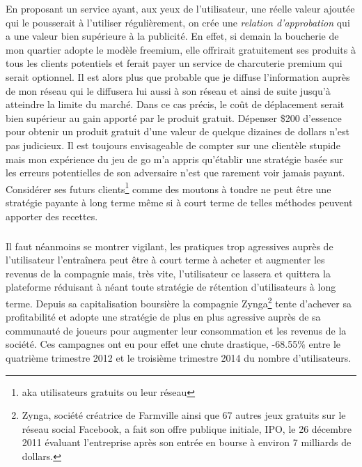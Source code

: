 \documentclass[11pt, a4paper ]{article}
\begin{document}
\begin{spacing}{1.5}
En proposant un service ayant, aux yeux de l'utilisateur, une réelle valeur ajoutée qui le pousserait à l'utiliser régulièrement, on crée une \emph{relation d'approbation} qui a une valeur bien supérieure à la publicité.
En effet, si demain la boucherie de mon quartier adopte le modèle freemium, elle offrirait gratuitement ses produits à tous les clients potentiels et ferait payer un service de charcuterie premium qui serait optionnel.
Il est alors plus que probable que je diffuse l'information auprès de mon réseau qui le diffusera lui aussi à son réseau et ainsi de suite jusqu'à atteindre la limite du marché. Dans ce cas précis, le coût de déplacement serait bien supérieur au gain apporté par le produit gratuit.
Dépenser \$200 d'essence pour obtenir un produit gratuit d'une valeur de quelque dizaines de dollars n'est pas judicieux. Il est toujours envisageable de compter sur une clientèle stupide mais mon expérience du jeu de go m'a appris qu'établir une stratégie basée sur les erreurs potentielles de son adversaire n'est que rarement voir jamais payant.
Considérer ses futurs clients\footnote{aka utilisateurs gratuits ou leur réseau} comme des moutons à tondre ne peut être une stratégie payante à long terme même si à court terme de telles méthodes peuvent apporter des recettes.
\subparagraph{}
Il faut néanmoins se montrer vigilant, les pratiques trop agressives auprès de l'utilisateur l’entraînera peut être à court terme à acheter et augmenter les revenus de la compagnie mais, très vite, l'utilisateur ce lassera et quittera la plateforme réduisant à néant toute stratégie de rétention d'utilisateurs à long terme. Depuis sa capitalisation boursière la compagnie Zynga\footnote{Zynga, société créatrice de Farmville ainsi que 67 autres jeux gratuits sur le réseau social Facebook, a fait son offre publique initiale, IPO, le 26 décembre 2011 évaluant l'entreprise après son entrée en bourse à environ 7 milliards de dollars.\cite{ipoZynga}} tente d'achever sa profitabilité et adopte une stratégie de plus en plus agressive auprès de sa communauté de joueurs pour augmenter leur consommation et les revenus de la société. Ces campagnes ont eu pour effet une chute drastique, -68.55\% entre le quatrième trimestre 2012 et le troisième trimestre 2014 du nombre d'utilisateurs.


\end{spacing}
\end{document}
